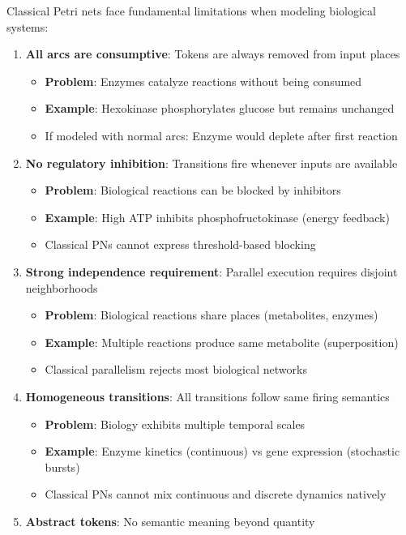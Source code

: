 Classical Petri nets face fundamental limitations when modeling
biological systems:

\begin{enumerate}
\def\labelenumi{\arabic{enumi}.}
\tightlist
\item
  \textbf{All arcs are consumptive}: Tokens are always removed from
  input places

  \begin{itemize}
  \tightlist
  \item
    \textbf{Problem}: Enzymes catalyze reactions without being consumed
  \item
    \textbf{Example}: Hexokinase phosphorylates glucose but remains
    unchanged
  \item
    If modeled with normal arcs: Enzyme would deplete after first
    reaction
  \end{itemize}
\item
  \textbf{No regulatory inhibition}: Transitions fire whenever inputs
  are available

  \begin{itemize}
  \tightlist
  \item
    \textbf{Problem}: Biological reactions can be blocked by inhibitors
  \item
    \textbf{Example}: High ATP inhibits phosphofructokinase (energy
    feedback)
  \item
    Classical PNs cannot express threshold-based blocking
  \end{itemize}
\item
  \textbf{Strong independence requirement}: Parallel execution requires
  disjoint neighborhoods

  \begin{itemize}
  \tightlist
  \item
    \textbf{Problem}: Biological reactions share places (metabolites,
    enzymes)
  \item
    \textbf{Example}: Multiple reactions produce same metabolite
    (superposition)
  \item
    Classical parallelism rejects most biological networks
  \end{itemize}
\item
  \textbf{Homogeneous transitions}: All transitions follow same firing
  semantics

  \begin{itemize}
  \tightlist
  \item
    \textbf{Problem}: Biology exhibits multiple temporal scales
  \item
    \textbf{Example}: Enzyme kinetics (continuous) vs gene expression
    (stochastic bursts)
  \item
    Classical PNs cannot mix continuous and discrete dynamics natively
  \end{itemize}
\item
  \textbf{Abstract tokens}: No semantic meaning beyond quantity


\end{enumerate}
